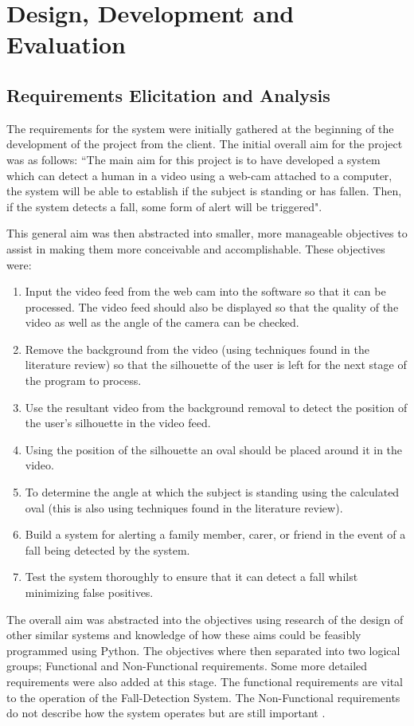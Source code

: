 \documentclass[11pt,a4paper]{report}
\begin{document}
\chapter{Design, Development and Evaluation}

\section{Requirements Elicitation and Analysis}

The requirements for the system were initially gathered at the beginning of the development of the project from the client. The initial overall aim for the project was as follows: ``The main aim for this project is to have developed a system which can detect a human in a video using a web-cam attached to a computer, the system will be able to establish if the subject is standing or has fallen. Then, if the system detects a fall, some form of alert will be triggered".

This general aim was then abstracted into smaller, more manageable objectives to assist in making them more conceivable and accomplishable. These objectives were:

\begin{enumerate}
	\item Input the video feed from the web cam into the software so that it can be processed. The video feed should also be displayed so that the quality of the video as well as the angle of the camera can be checked.
    \item Remove the background from the video (using techniques found in the literature review) so that the silhouette of the user is left for the next stage of the program to process.
    \item Use the resultant video from the background removal to detect the position of the user’s silhouette in the video feed.
    \item Using the position of the silhouette an oval should be placed around it in the video.
    \item To determine the angle at which the subject is standing using the calculated oval (this is also using
techniques found in the literature review).
	\item Build a system for alerting a family member, carer, or friend in the event of a fall being detected by the
system.
	\item Test the system thoroughly to ensure that it can detect a fall whilst minimizing false positives.
\end{enumerate}
\noindent
The overall aim was abstracted into the objectives using research of the design of other similar systems and knowledge of how these aims could be feasibly programmed using Python. The objectives where then separated into two logical groups; Functional and Non-Functional requirements. Some more detailed requirements were also added at this stage. The functional requirements are vital to the operation of the Fall-Detection System. The Non-Functional requirements do not describe how the system operates but are still important .   
\end{document}
